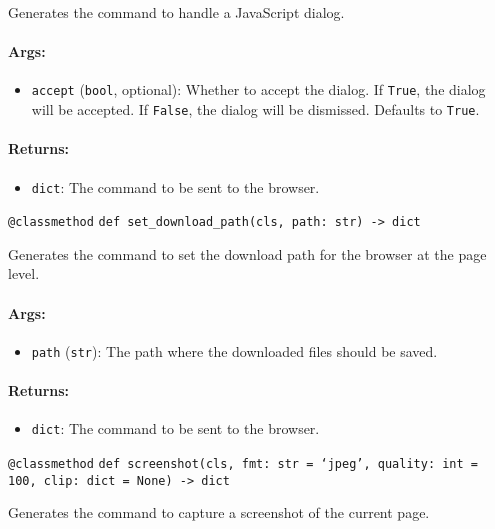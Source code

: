 \documentclass{article}
\begin{document}
\noindent Generates the command to handle a JavaScript dialog.

\paragraph{Args:}
\begin{itemize}
    \item \texttt{accept} (\texttt{bool}, optional): Whether to accept the dialog. If \texttt{True}, the dialog will be accepted. If \texttt{False}, the dialog will be dismissed. Defaults to \texttt{True}.
\end{itemize}

\paragraph{Returns:}
\begin{itemize}
    \item \texttt{dict}: The command to be sent to the browser.
\end{itemize}

\noindent\texttt{@classmethod}
\noindent\texttt{def set\_download\_path(cls, path: str) -> dict}

\noindent Generates the command to set the download path for the browser at the page level.

\paragraph{Args:}
\begin{itemize}
    \item \texttt{path} (\texttt{str}): The path where the downloaded files should be saved.
\end{itemize}

\paragraph{Returns:}
\begin{itemize}
    \item \texttt{dict}: The command to be sent to the browser.
\end{itemize}

\noindent\texttt{@classmethod}
\noindent\texttt{def screenshot(cls, fmt: str = `jpeg', quality: int = 100, clip: dict = None) -> dict}

\noindent Generates the command to capture a screenshot of the current page.
\end{document}

